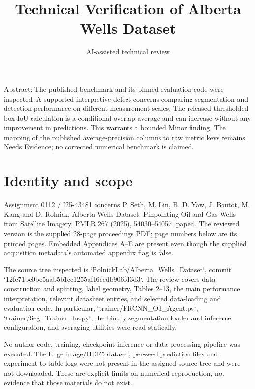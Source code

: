 \documentclass[10pt]{article}
\title{Technical Verification of
Alberta Wells Dataset}
\author{AI-assisted technical review}
\date{}
\begin{document}
\maketitle
Abstract: The published benchmark and its pinned evaluation code were inspected. A supported interpretive defect concerns comparing segmentation and detection performance on different measurement scales. The released thresholded box-IoU calculation is a conditional overlap average and can increase without any improvement in predictions. This warrants a bounded Minor finding. The mapping of the published average-precision columns to raw metric keys remains Needs Evidence; no corrected numerical benchmark is claimed.\par
\section*{Identity and scope}
Assignment 0112 / I25-43481 concerns P. Seth, M. Lin, B. D. Yaw, J. Boutot, M. Kang and D. Rolnick, Alberta Wells Dataset: Pinpointing Oil and Gas Wells from Satellite Imagery, PMLR 267 (2025), 54030–54057 [paper]. The reviewed version is the supplied 28-page proceedings PDF; page numbers below are its printed pages. Embedded Appendices A–E are present even though the supplied acquisition metadata’s automated appendix flag is false.\par
The source tree inspected is `RolnickLab/Alberta\_Wells\_Dataset`, commit `12fc71bc0be5aab5b1cc1255af16cedb906fd3d3`. The review covers data construction and splitting, label geometry, Tables 2–13, the main performance interpretation, relevant datasheet entries, and selected data-loading and evaluation code. In particular, `trainer/FRCNN\_Od\_Agent.py`, `trainer/Seg\_Trainer\_lrs.py`, the binary segmentation loader and inference configuration, and averaging utilities were read statically.\par
No author code, training, checkpoint inference or data-processing pipeline was executed. The large image/HDF5 dataset, per-seed prediction files and experiment-to-table logs were not present in the assigned source tree and were not downloaded. These are explicit limits on numerical reproduction, not evidence that those materials do not exist.\par
\end{document}
